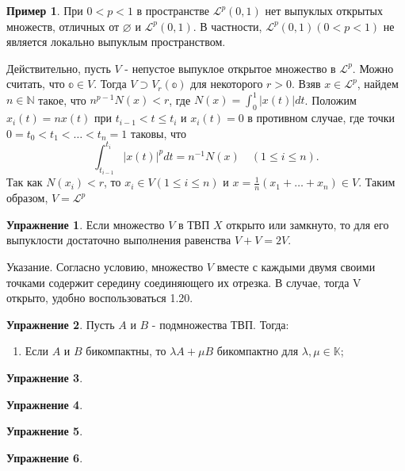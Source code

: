 \documentclass[a4paper, 12pt]{article}
\theoremstyle{definition}
\newtheorem{example}{Пример}
\newtheorem{problem}{Упражнение}[section]
\theoremstyle{remark}
\begin{document}
\begin{example}
    При $0 < p < 1$ в пространстве $\mathcal {L}^p (0,1)$ нет выпуклых открытых множеств, отличных от $\varnothing$ и $\mathcal {L}^p (0,1)$. В частности, $\mathcal {L}^p (0,1) (0< p < 1)$ не является локально выпуклым пространством.

    Действительно, пусть $V$ - непустое выпуклое открытое множество в $\mathcal {L}^p$. Можно считать, что $\mathbb{o}\in V$. Тогда $V\supset V_r(\mathbb{o})$ для некоторого $r > 0$. Взяв $x\in \mathcal {L}^p $, найдем $n\in \mathbb{N}$ такое, что $n^{p-1}N(x)< r$, где $N(x) = \int_0^1 |x(t)|dt$. Положим $x_i(t) = nx(t)$ при $t_{i-1}< t \le t_i$ и $x_i(t) = 0$ в противном случае, где точки $0 = t_0< t_1 < \dots < t_n = 1$ таковы, что
    \[\int_{t_{i-1}}^{t_i} |x(t)|^p dt = n^{-1} N(x) \quad (1\le i \le n).\]
    Так как $N(x_i)< r$, то $x_i\in V (1 \le i \le n)$ и $x = \frac{1}{n} (x_1 + \dots + x_n)\in V$. Таким образом, $V = \mathcal L ^p$
\end{example}
\begin{problem}
    Если множество $V$ в ТВП $X$ открыто или замкнуто, то для его выпуклости достаточно выполнения равенства $V+V=2V$.

    Указание. Согласно условию, множество $V$ вместе с каждыми двумя своими точками содержит середину соединяющего их отрезка. В случае, тогда V открыто, удобно воспользоваться 1.20.
\end{problem}
\begin{problem}
    Пусть $A$ и $B$ - подмножества ТВП. Тогда:
    \begin{enumerate}
        \item Если $A$ и $B$ бикомпактны, то $\lambda A + \mu B$ бикомпактно для $\lambda, \mu \in \mathbb{K}$;
    \end{enumerate}
\end{problem}
\begin{problem}
    
\end{problem}
\begin{problem}
    
\end{problem}
\begin{problem}
    
\end{problem}
\begin{problem}
    
\end{problem}
\end{document}
